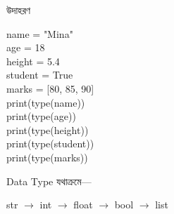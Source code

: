 

\begin{examplebox}{উদাহরণ}

\begin{codebox}
\begin{english}
\ttfamily
name = "Mina"\\
age = 18\\
height = 5.4\\
student = True\\
marks = [80, 85, 90]\\[0.5mm]
print(type(name))\\
print(type(age))\\
print(type(height))\\
print(type(student))\\
print(type(marks))
\end{english}
\end{codebox}

Data Type যথাক্রমে—

\begin{center}
\textenglish{\ttfamily str}
\(\longrightarrow\)
\textenglish{\ttfamily int}
\(\longrightarrow\)
\textenglish{\ttfamily float}
\(\longrightarrow\)
\textenglish{\ttfamily bool}
\(\longrightarrow\)
\textenglish{\ttfamily list}
\end{center}

\end{examplebox}



